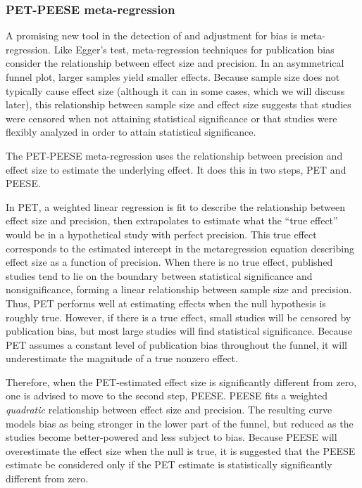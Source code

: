 \documentclass[man]{apa6}
\begin{document}
\subsubsection{PET-PEESE meta-regression}
A promising new tool in the detection of and adjustment for bias is meta-regression. Like Egger's test, meta-regression techniques for publication bias consider the relationship between effect size and precision. In an asymmetrical funnel plot, larger samples yield smaller effects. Because sample size does not typically cause effect size (although it can in some cases, which we will discuss later), this relationship between sample size and effect size suggests that studies were censored when not attaining statistical significance or that studies were flexibly analyzed in order to attain statistical significance. 

The PET-PEESE meta-regression \citep{Stanley:Doucouliagos:2013} %
uses the relationship between precision and effect size to estimate the underlying effect. It does this in two steps, PET and PEESE. 

In PET, a weighted linear regression is fit to describe the relationship between effect size and precision, then extrapolates to estimate what the ``true effect'' would be in a hypothetical study with perfect precision. This true effect corresponds to the estimated intercept in the metaregression equation describing effect size as a function of precision. When there is no true effect, published studies tend to lie on the boundary between statistical significance and nonsignificance, forming a linear relationship between sample size and precision. Thus, PET performs well at estimating effects when the null hypothesis is roughly true. However, if there is a true effect, small studies will be censored by publication bias, but most large studies will find statistical significance. Because PET assumes a constant level of publication bias throughout the funnel, it will underestimate the magnitude of a true nonzero effect.

Therefore, when the PET-estimated effect size is significantly different from zero, one is advised to move to the second step, PEESE. PEESE fits a weighted {\em quadratic} relationship between effect size and precision. The resulting curve models bias as being stronger in the lower part of the funnel, but reduced as the studies become better-powered and less subject to bias. Because PEESE will overestimate the effect size when the null is true, it is suggested that the PEESE estimate be considered only if the PET estimate is statistically significantly different from zero.
\end{document}
